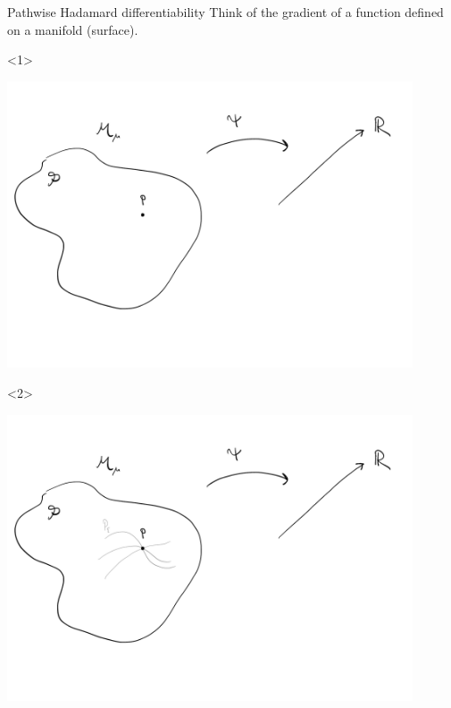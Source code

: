 \documentclass{beamer}\usepackage{listings}
\begin{document}
\begin{frame}[label={sec:orgd72ec36}]{Pathwise Hadamard differentiability}
Think of the gradient of a function defined on a manifold (surface).

\begin{onlyenv}<1>
\begin{center}
\includegraphics[width=0.9\textwidth]{./figures/Pathwise-derivative0.pdf}
\end{center}
\end{onlyenv}


\begin{onlyenv}<2>
\begin{center}
\includegraphics[width=0.9\textwidth]{./figures/Pathwise-derivative1.pdf}
\end{center}
\end{onlyenv}


\end{frame}
\end{document}
